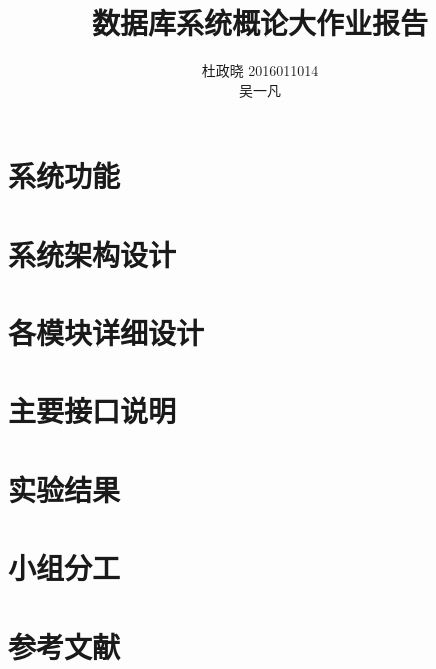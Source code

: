 \documentclass[11pt,UTF8]{report}
\title{数据库系统概论大作业报告}
\author{杜政晓 2016011014\\
吴一凡 }
\begin{document}
\maketitle

\section{系统功能}

\section{系统架构设计}

\section{各模块详细设计}

\section{主要接口说明}

\section{实验结果}

\section{小组分工}

\section{参考文献}
\end{document}
